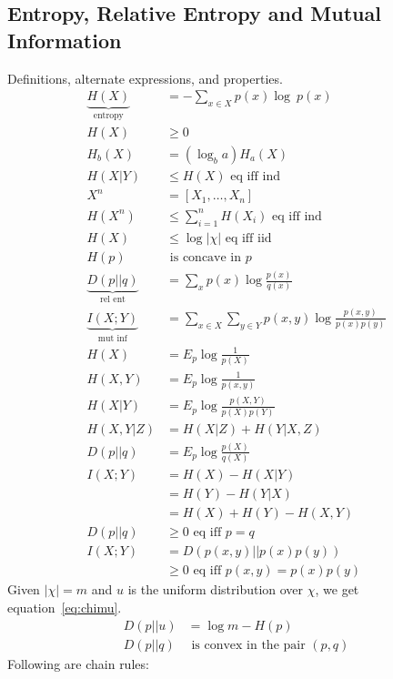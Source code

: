 \documentclass[10pt]{article}
\begin{document}
\begin{scriptsize}
\begin{multicols}{3}

\section*{Entropy, Relative Entropy and Mutual Information}
Definitions, alternate expressions, and properties.
\begin{align}
\underbrace{H(X)}_\text{entropy}&= -\sum_{x\in X} p(x) \log\ p(x) \label{eq:entropy}\\
H(X)& \geq 0\\
H_b(X)&= (\log_b a)H_a(X)\\
H(X|Y)& \leq  H(X)\text{ eq iff ind} \label{eq:conditioning}\\
X^n&=[X_1,\ldots,X_n]\\
H(X^n)& \leq \sum_{i=1}^n H(X_i)\text{ eq iff ind} \label{eq:jointsum}\\
H(X)&\leq  \log |\chi|  \text{ eq iff iid}\label{eq:alphabetentropy}\\
H(p)&\text{ is concave in $p$}\\
\underbrace{D(p||q)}_\text{rel ent} & = \sum_x p(x) \log \frac{p(x)}{q(x)}\\
\underbrace{I(X;Y)}_\text{mut inf} & = \sum_{x\in X} \sum_{y \in Y} p(x,y) \log \frac{p(x,y)}{p(x)p(y)}\\
H(X)&=E_p \log \frac{1}{p(X)}\\
H(X,Y)&=E_p\log \frac{1}{p(x,y)}\\
H(X|Y)&=E_p\log \frac{p(X,Y)}{p(X)p(Y)}\\
H(X,Y|Z) &= H(X|Z) + H(Y|X,Z) \\
D(p||q)&=E_p\log \frac{p(X)}{q(X)}\\
I(X;Y)&=H(X)-H(X|Y)\\
&=H(Y)-H(Y|X)\\
&=H(X)+H(Y)-H(X,Y)\\
D(p||q)&\geq 0 \text{ eq iff $p=q$}\\
I(X;Y)&=D(p(x,y)||p(x)p(y))\\
	&\geq 0 \text{ eq iff $p(x,y)=p(x)p(y)$}
\end{align}
Given $|\chi|=m$ and $u$ is the uniform distribution over $\chi$, we get equation~\ref{eq:chimu}.
\begin{align}
D(p||u)&=\log m - H(p)\label{eq:chimu}\\
D(p||q)&\text{ is convex in the pair }(p,q)
\end{align}
Following are chain rules:

\end{multicols}
\end{scriptsize}
\end{document}
